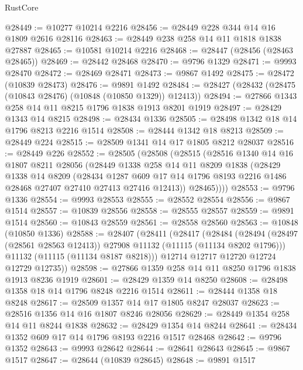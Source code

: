 \begin{lexlean}{RustCore}
\begin{coremodule}
@28449 := @10277 @10214 @2216
@28456 := @28449 @228 @344 @14 @16 @1809 @2616 @28116
@28463 := @28449 @238 @258 @14 @11 @1818 @1838 @27887
@28465 := @10581 @10214 @2216
@28468 := @28447 (@28456 (@28463 @28465))
@28469 := @28442 @28468
@28470 := @9796 @1329
@28471 := @9993 @28470
@28472 := @28469 @28471
@28473 := @9867 @1492
@28475 := @28472 (@10839 @28473)
@28476 := @9891 @1492
@28484 := @28427 (@28432 (@28475 (@10843 @28476) (@10848 (@10850 @1329)) @12413))
@28494 := @27866 @1343 @258 @14 @11 @8215 @1796 @1838 @1913 @8201 @1919
@28497 := @28429 @1343 @14 @8215
@28498 := @28434 @1336
@28505 := @28498 @1342 @18 @14 @1796 @8213 @2216 @1514
@28508 := @28444 @1342 @18 @8213
@28509 := @28449 @224
@28515 := @28509 @1341 @14 @17 @1805 @8212 @28037
@28516 := @28449 @226
@28552 := @28505
    (@28508
      (@28515
        (@28516
          @1340
          @14
          @16
          @1807
          @8211
          @28056
          (@28449
            @1338
            @258
            @14
            @11
            @8209
            @1838
            (@28429
              @1338
              @14
              @8209
              (@28434
                @1287
                @609
                @17
                @14
                @1796
                @8193
                @2216
                @1486
                @28468
                @27407
                @27410
                @27413
                @27416
                @12413))
            @28465))))
@28553 := @9796 @1336
@28554 := @9993 @28553
@28555 := @28552 @28554
@28556 := @9867 @1514
@28557 := @10839 @28556
@28558 := @28555 @28557
@28559 := @9891 @1514
@28560 := @10843 @28559
@28561 := @28558 @28560
@28563 := @10848 (@10850 @1336)
@28588 := @28407
    (@28411
      (@28417
        (@28484
          (@28494 (@28497 (@28561 @28563 @12413)) @27908 @11132 (@11115 (@11134 @8202 @1796)))
          @11132
          (@11115 (@11134 @8187 @8218)))
        @12714
        @12717
        @12720
        @12724
        @12729
        @12735))
@28598 := @27866 @1359 @258 @14 @11 @8250 @1796 @1838 @1913 @8236 @1919
@28601 := @28429 @1359 @14 @8250
@28608 := @28498 @1358 @18 @14 @1796 @8248 @2216 @1514
@28611 := @28444 @1358 @18 @8248
@28617 := @28509 @1357 @14 @17 @1805 @8247 @28037
@28623 := @28516 @1356 @14 @16 @1807 @8246 @28056
@28629 := @28449 @1354 @258 @14 @11 @8244 @1838
@28632 := @28429 @1354 @14 @8244
@28641 := @28434 @1352 @609 @17 @14 @1796 @8193 @2216 @1517 @28468
@28642 := @9796 @1352
@28643 := @9993 @28642
@28644 := @28641 @28643
@28645 := @9867 @1517
@28647 := @28644 (@10839 @28645)
@28648 := @9891 @1517

\end{coremodule}
\end{lexlean}
